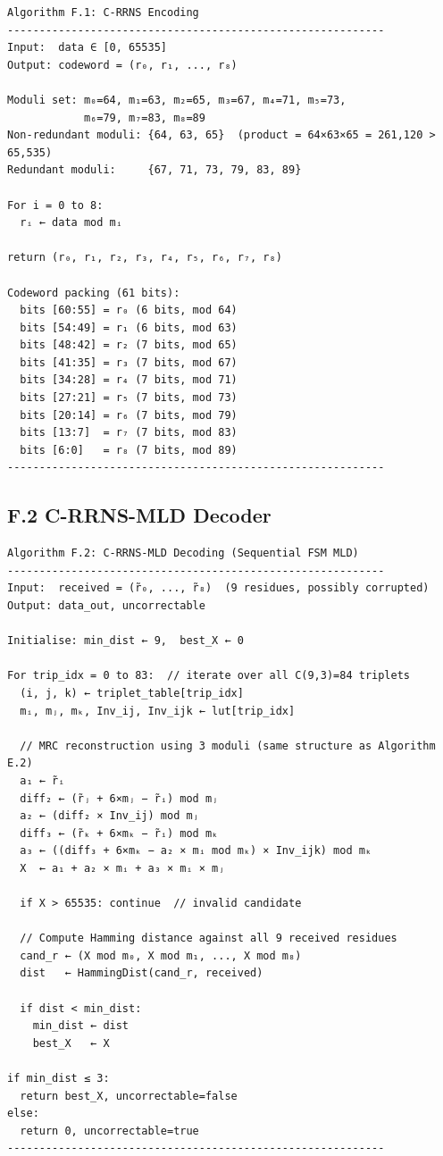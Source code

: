 \documentclass[
  12pt,
  a4paper]{report}
\begin{document}
\begin{verbatim}
Algorithm F.1: C-RRNS Encoding
-----------------------------------------------------------
Input:  data ∈ [0, 65535]
Output: codeword = (r₀, r₁, ..., r₈)

Moduli set: m₀=64, m₁=63, m₂=65, m₃=67, m₄=71, m₅=73,
            m₆=79, m₇=83, m₈=89
Non-redundant moduli: {64, 63, 65}  (product = 64×63×65 = 261,120 > 65,535)
Redundant moduli:     {67, 71, 73, 79, 83, 89}

For i = 0 to 8:
  rᵢ ← data mod mᵢ

return (r₀, r₁, r₂, r₃, r₄, r₅, r₆, r₇, r₈)

Codeword packing (61 bits):
  bits [60:55] = r₀ (6 bits, mod 64)
  bits [54:49] = r₁ (6 bits, mod 63)
  bits [48:42] = r₂ (7 bits, mod 65)
  bits [41:35] = r₃ (7 bits, mod 67)
  bits [34:28] = r₄ (7 bits, mod 71)
  bits [27:21] = r₅ (7 bits, mod 73)
  bits [20:14] = r₆ (7 bits, mod 79)
  bits [13:7]  = r₇ (7 bits, mod 83)
  bits [6:0]   = r₈ (7 bits, mod 89)
-----------------------------------------------------------
\end{verbatim}

\subsection{F.2 C-RRNS-MLD Decoder}\label{f.2-c-rrns-mld-decoder}

\begin{verbatim}
Algorithm F.2: C-RRNS-MLD Decoding (Sequential FSM MLD)
-----------------------------------------------------------
Input:  received = (r̃₀, ..., r̃₈)  (9 residues, possibly corrupted)
Output: data_out, uncorrectable

Initialise: min_dist ← 9,  best_X ← 0

For trip_idx = 0 to 83:  // iterate over all C(9,3)=84 triplets
  (i, j, k) ← triplet_table[trip_idx]
  mᵢ, mⱼ, mₖ, Inv_ij, Inv_ijk ← lut[trip_idx]

  // MRC reconstruction using 3 moduli (same structure as Algorithm E.2)
  a₁ ← r̃ᵢ
  diff₂ ← (r̃ⱼ + 6×mⱼ − r̃ᵢ) mod mⱼ
  a₂ ← (diff₂ × Inv_ij) mod mⱼ
  diff₃ ← (r̃ₖ + 6×mₖ − r̃ᵢ) mod mₖ
  a₃ ← ((diff₃ + 6×mₖ − a₂ × mᵢ mod mₖ) × Inv_ijk) mod mₖ
  X  ← a₁ + a₂ × mᵢ + a₃ × mᵢ × mⱼ

  if X > 65535: continue  // invalid candidate

  // Compute Hamming distance against all 9 received residues
  cand_r ← (X mod m₀, X mod m₁, ..., X mod m₈)
  dist   ← HammingDist(cand_r, received)

  if dist < min_dist:
    min_dist ← dist
    best_X   ← X

if min_dist ≤ 3:
  return best_X, uncorrectable=false
else:
  return 0, uncorrectable=true
-----------------------------------------------------------
\end{verbatim}
\end{document}
